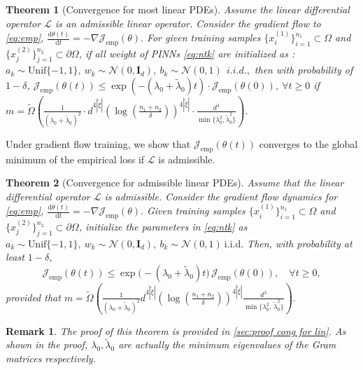 \documentclass{article}
\newtheorem{theorem}{Theorem}
\newtheorem{remark}{Remark}
\renewcommand{\d}{\mathrm{d}}
\begin{document}
\begin{theorem}[Convergence for most linear PDEs]\label{thm:cong for lin fi}
    Assume the linear differential operator $\mathcal{L}$ is an admissible linear operator. Consider the gradient flow to \cref{eq:emp},
    $
        \frac{\d \theta(t)}{\d t}=-\nabla \mathcal{J}_{\text{emp}}(\theta).
    $  
    For given training samples \(\{x_i^{(1)}\}_{i=1}^{n_1} \subset \Omega\) and \(\{x_j^{(2)}\}_{j=1}^{n_2} \subset \partial\Omega\), if all weight of PINNs \cref{eq:ntk} are initialized as :
    $
        a_k \sim \text{Unif}\{-1,1\}, \ w_k \sim \mathcal{N}(0, \mathbf{I}_{d}), \ b_k \sim \mathcal{N}(0, 1) \ \ i.i.d. ,
    $
    then with probability of $1-\delta$, 
    $
        \mathcal{J}_{\text{emp}}(\theta(t))\le \exp\left(-(\lambda_0+\tilde{\lambda}_0) t\right)\cdot \mathcal{J}_{\text{emp}}(\theta(0)),\ \forall t\ge 0
    $
    if 
$
    m  =\widetilde{\Omega}\left( \frac{1}{\left(\lambda_0 + \tilde{\lambda}_0\right)^2} \cdot 
   d^{4|\tilde{\xi}|} \left(\log\left(\frac{n_1+n_2}{\delta}\right)\right)^{4|\tilde{\xi}|} 
    \cdot \frac{d^3}{\min\{\lambda_0^2, \tilde\lambda_0^2\}}\right) .
$
\end{theorem}
\fi
Under gradient flow training, we show that $\mathcal{J}_{\text{emp}}(\theta(t))$ converges to the global minimum of the empirical loss if $\mathcal{L}$ is admissible.
\begin{theorem}[Convergence for admissible linear PDEs]\label{thm:cong for lin}
Assume that the linear differential operator $\mathcal{L}$ is admissible. Consider the gradient flow dynamics for \cref{eq:emp}, 
$
    \frac{\d \theta(t)}{\d t} = -\nabla \mathcal{J}_{\text{emp}}(\theta).
$
Given training samples $\{x_i^{(1)}\}_{i=1}^{n_1} \subset \Omega$ and $\{x_j^{(2)}\}_{j=1}^{n_2} \subset \partial\Omega$, initialize the parameters in \cref{eq:ntk} as
$
    a_k \sim \text{Unif}\{-1, 1\},\ w_k \sim \mathcal{N}(0, \mathbf{I}_d), \ b_k \sim \mathcal{N}(0, 1) \ \text{i.i.d.}
$
Then, with probability at least $1-\delta$,
\[
    \mathcal{J}_{\text{emp}}(\theta(t)) \leq \exp\big( -(\lambda_0 + \tilde{\lambda}_0) t \big)\, \mathcal{J}_{\text{emp}}(\theta(0)),\quad \forall t \ge 0,
\]
provided that
$
    m = \widetilde{\Omega}\left(
    \frac{1}{\left(\lambda_0 + \tilde{\lambda}_0\right)^2}
    d^{4|\tilde{\xi}|} 
    \left(\log\left(\frac{n_1+n_2}{\delta}\right)\right)^{4|\tilde{\xi}|} 
    \frac{d^3}{\min\{\lambda_0^2,\, \tilde{\lambda}_0^2\}}
    \right).
$
\end{theorem}

\begin{remark}
The proof of this theorem is provided in \cref{sec:proof cong for lin}. As shown in the proof, \(\lambda_0, \tilde{\lambda}_0\) are actually the minimum eigenvalues of the Gram matrices respectively.    
\end{remark}
\end{document}
